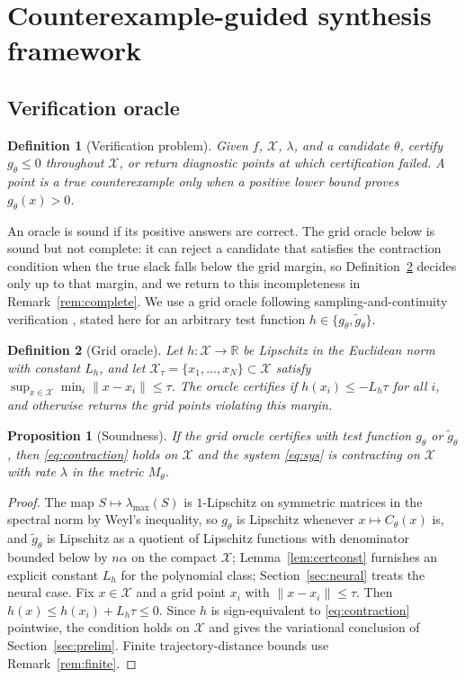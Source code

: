 \documentclass[12pt,onecolumn,journal]{IEEEtran}
\newtheorem{proposition}{Proposition}
\newtheorem{definition}{Definition}
\newcommand{\R}{\mathbb{R}}
\newcommand{\X}{\mathcal{X}}
\newcommand{\lmax}{\lambda_{\max}}
\begin{document}
\section{Counterexample-guided synthesis framework}
\label{sec:framework}

\subsection{Verification oracle}

\begin{definition}[Verification problem]
Given $f$, $\X$, $\lambda$, and a candidate $\theta$, certify $g_\theta\le0$ throughout $\X$, or return diagnostic points at which certification failed. A point is a true counterexample only when a positive lower bound proves $g_\theta(x)>0$.
\end{definition}

An oracle is sound if its positive answers are correct. The grid oracle below is sound but not complete: it can reject a candidate that satisfies the contraction condition when the true slack falls below the grid margin, so Definition~\ref{def:oracle} decides only up to that margin, and we return to this incompleteness in Remark~\ref{rem:complete}. We use a grid oracle following sampling-and-continuity verification \cite{bobiti2018,sun2021}, stated here for an arbitrary test function $h \in \{g_\theta, \tilde g_\theta\}$.

\begin{definition}[Grid oracle]
\label{def:oracle}
Let $h : \X \to \R$ be Lipschitz in the Euclidean norm with constant $L_h$, and let $\X_\tau = \{x_1, \dots, x_N\} \subset \X$ satisfy $\sup_{x \in \X} \min_i \|x - x_i\| \le \tau$. The oracle certifies if $h(x_i) \le -L_h \tau$ for all $i$, and otherwise returns the grid points violating this margin.
\end{definition}

\begin{proposition}[Soundness]
\label{prop:grid}
If the grid oracle certifies with test function $g_\theta$ or $\tilde g_\theta$, then \eqref{eq:contraction} holds on $\X$ and the system \eqref{eq:sys} is contracting on $\X$ with rate $\lambda$ in the metric $M_\theta$.
\end{proposition}

\begin{proof}
The map $S \mapsto \lmax(S)$ is $1$-Lipschitz on symmetric matrices in the spectral norm by Weyl's inequality, so $g_\theta$ is Lipschitz whenever $x \mapsto C_\theta(x)$ is, and $\tilde g_\theta$ is Lipschitz as a quotient of Lipschitz functions with denominator bounded below by $n\alpha$ on the compact $\X$; Lemma~\ref{lem:certconst} furnishes an explicit constant $L_h$ for the polynomial class; Section~\ref{sec:neural} treats the neural case. Fix $x \in \X$ and a grid point $x_i$ with $\|x - x_i\| \le \tau$. Then $h(x) \le h(x_i) + L_h \tau \le 0$. Since $h$ is sign-equivalent to \eqref{eq:contraction} pointwise, the condition holds on $\X$ and gives the variational conclusion of Section~\ref{sec:prelim}. Finite trajectory-distance bounds use Remark~\ref{rem:finite}.
\end{proof}
\end{document}
